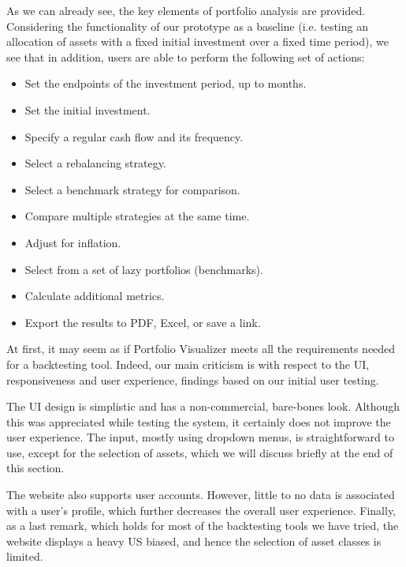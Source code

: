 \documentclass[main.tex]{subfiles}
\begin{document}
As we can already see, the key elements of portfolio analysis are provided. Considering the functionality of our prototype as a baseline (i.e. testing an allocation of assets with a fixed initial investment over a fixed time period), we see that in addition, users are able to perform the following set of actions:

\begin{itemize}
  \item Set the endpoints of the investment period, up to months.
  \item Set the initial investment. 
  \item Specify a regular cash flow and its frequency.
  \item Select a rebalancing strategy.
  \item Select a benchmark strategy for comparison.
  \item Compare multiple strategies at the same time.
  \item Adjust for inflation.
  \item Select from a set of lazy portfolios (benchmarks).
  \item Calculate additional metrics.
  \item Export the results to PDF, Excel, or save a link. 
\end{itemize}

At first, it may seem as if Portfolio Visualizer meets all the requirements needed for a backtesting tool. Indeed, our main criticism is with respect to the UI, responsiveness and user experience, findings based on our initial user testing. 

The UI design is simplistic and has a non-commercial, bare-bones look. Although this was appreciated while testing the system, it certainly does not improve the user experience. The input, mostly using dropdown menus, is straightforward to use, except for the selection of assets, which we will discuss briefly at the end of this section.


The website also supports user accounts. However, little to no data is associated with a user's profile, which further decreases the overall user experience. Finally, as a last remark, which holds for most of the backtesting tools we have tried, the website displays a heavy US biased, and hence the selection of asset classes is limited.
\end{document}
